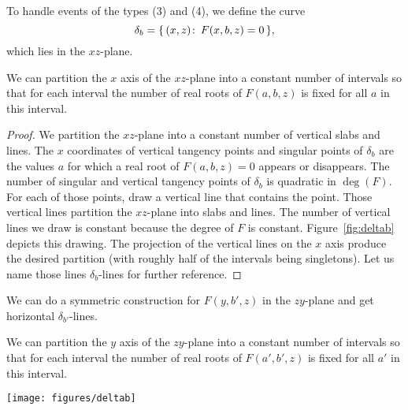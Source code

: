 To handle events of the types (3) and (4), we define the curve
\begin{displaymath}
	\delta_b = \{\,(x,z) \colon\, F(x,b,z) = 0\,\},
\end{displaymath}
which lies in the $xz$-plane.
\begin{lemma}
    We can partition the $x$ axis of the $xz$-plane into a constant number of
    intervals so that for each interval the number of real roots of
    $F(a,b,z)$ is fixed for all $a$ in this interval.
\end{lemma}
\begin{proof}
    We partition the $xz$-plane into a constant number of vertical
    slabs and lines.
    The $x$ coordinates of vertical tangency points and
    singular points of $\delta_b$ are the values $a$ for which
    a real root of $F(a,b,z)=0$ appears or disappears.
    The number of singular and vertical tangency points of $\delta_b$ is quadratic in $\deg(F)$.
    For each of those points, draw a vertical line that contains the point.
    Those vertical lines partition the $xz$-plane into slabs and lines.
    The number of
    vertical lines we draw is constant because the degree of $F$ is
    constant.
    Figure~\ref{fig:deltab} depicts this drawing.
    The projection of the vertical lines on the $x$ axis produce the desired
    partition (with roughly half of the intervals being singletons).
    Let us name those lines $\delta_b$-lines for further reference.
\end{proof}
We can do a symmetric construction for $F(y,b',z)$ in the $zy$-plane and
get horizontal $\delta_{b'}$-lines.
\begin{lemma}
    We can partition the $y$ axis of the $zy$-plane into a constant number of
    intervals so that for each interval the number of real roots of
    $F(a',b',z)$ is fixed for all $a'$ in this interval.
\end{lemma}

\begin{figure*}
\centering
\texttt{[image: figures/deltab]}
\caption{The vertical tangency points (VTP), self-intersection points
(SIP) and degenerate lines (DL) of $\delta_b$ partition the $A$
axis into intervals. For all $x$ of the same interval, the
polynomial $F(x,b,z) \in \mathbb{R}[z]$ has a fixed number of real
roots.}\label{fig:deltab}
\end{figure*}

